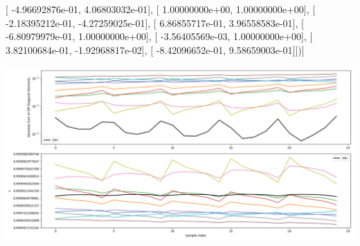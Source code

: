 \documentclass{article}
\begin{document}
       [ -4.96692876e-01,   4.06803032e-01],
       [  1.00000000e+00,   1.00000000e+00],
       [ -2.18395212e-01,  -4.27259025e-01],
       [  6.86855717e-01,   3.96558583e-01],
       [ -6.80979979e-01,   1.00000000e+00],
       [ -3.56405569e-03,   1.00000000e+00],
       [  3.82100684e-01,  -1.92968817e-02],
       [ -8.42096652e-01,   9.58659003e-01]])]
\begin{center}
\includegraphics[scale=.9]{report_pickled_controls216/control_dpn_all.png}

\end{center}
\end{document}
